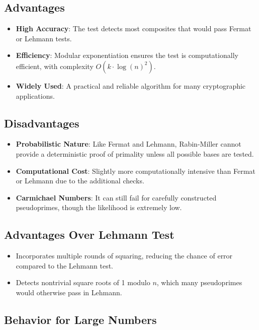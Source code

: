 \documentclass[12pt]{article}
\begin{document}
\subsection*{Advantages}

\begin{itemize}
    \item \textbf{High Accuracy}: The test detects most composites that would pass Fermat or Lehmann tests.
    \item \textbf{Efficiency}: Modular exponentiation ensures the test is computationally efficient, with complexity \( O(k \cdot \log(n)^2) \).
    \item \textbf{Widely Used}: A practical and reliable algorithm for many cryptographic applications.
\end{itemize}

\subsection*{Disadvantages}

\begin{itemize}
    \item \textbf{Probabilistic Nature}: Like Fermat and Lehmann, Rabin-Miller cannot provide a deterministic proof of primality unless all possible bases are tested.
    \item \textbf{Computational Cost}: Slightly more computationally intensive than Fermat or Lehmann due to the additional checks.
    \item \textbf{Carmichael Numbers}: It can still fail for carefully constructed pseudoprimes, though the likelihood is extremely low.
\end{itemize}

\subsection*{Advantages Over Lehmann Test}

\begin{itemize}
    \item Incorporates multiple rounds of squaring, reducing the chance of error compared to the Lehmann test.
    \item Detects nontrivial square roots of 1 modulo \( n \), which many pseudoprimes would otherwise pass in Lehmann.
\end{itemize}

\subsection*{Behavior for Large Numbers}
\end{document}
